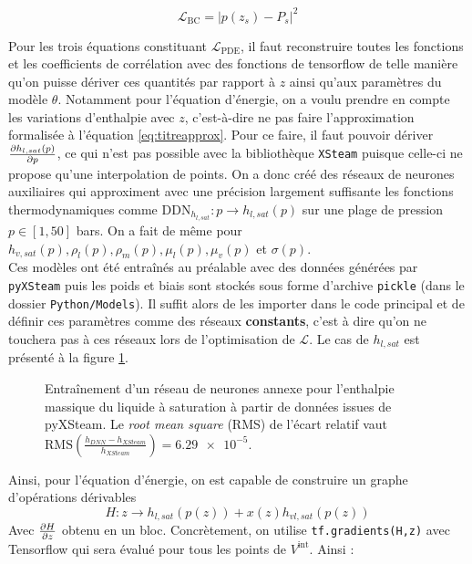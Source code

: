 \begin{equation}
    \mathcal{L}_{\text{BC}} = \left| p(z_s) - P_s\right|^2
\end{equation}

Pour les trois équations constituant $\mathcal{L}_{\text{PDE}}$, il faut reconstruire toutes les fonctions et les coefficients de corrélation avec des fonctions de tensorflow de telle manière qu'on puisse dériver ces quantités par rapport à $z$ ainsi qu'aux paramètres du modèle $\theta$. Notamment pour l'équation d'énergie, on a voulu prendre en compte les variations d'enthalpie avec $z$, c'est-à-dire ne pas faire l'approximation formalisée à l'équation \ref{eq:titreapprox}. Pour ce faire, il faut pouvoir dériver $\pder[h_{l,sat}(p)]{p}$, ce qui n'est pas possible avec la bibliothèque \verb|XSteam| puisque celle-ci ne propose qu'une interpolation de points. On a donc créé des réseaux de neurones auxiliaires qui approximent avec une précision largement suffisante les fonctions thermodynamiques comme $\text{DDN}_{h_{l,sat}} : p \rightarrow h_{l,sat}(p)$ sur une plage de pression $p \in[1, 50]$ bars. On a fait de même pour $h_{v,sat}(p),\rho_l(p),\rho_m(p),\mu_l(p),\mu_v(p)$ et $\sigma(p)$.\\

Ces modèles ont été entraînés au préalable avec des données générées par \verb|pyXSteam| puis les poids et biais sont stockés sous forme d'archive \verb|pickle| (dans le dossier \verb|Python/Models|). Il suffit alors de les importer dans le code principal et de définir ces paramètres comme des réseaux \textbf{constants}, c'est à dire qu'on ne touchera pas à ces réseaux lors de l'optimisation de $\mathcal{L}$. Le cas de $h_{l,sat}$ est présenté à la figure \ref{fig:DNN_enthalpy}.\\

\begin{figure}
    \centering
    \resizebox{0.5\linewidth}{!}{}
    \caption{Entraînement d'un réseau de neurones annexe pour l'enthalpie massique du liquide à saturation à partir de données issues de pyXSteam. Le \textit{root mean square} (RMS) de l'écart relatif vaut $ \text{RMS}\left(\frac{h_{DNN}-h_{XSteam}}{h_{XSteam}}\right)  = \num{6.29e-5}$.}
    \label{fig:DNN_enthalpy}
\end{figure}

Ainsi, pour l'équation d'énergie, on est capable de construire un graphe d'opérations dérivables 
\begin{equation}
    H : z \rightarrow h_{l,sat}(p(z)) + x(z)h_{vl,sat}(p(z))
\end{equation}
Avec $\pder[H]{z}$ obtenu en un bloc. Concrètement, on utilise \verb|tf.gradients(H,z)| avec Tensorflow qui sera évalué pour tous les points de $V^{\text{int}}$. Ainsi :

